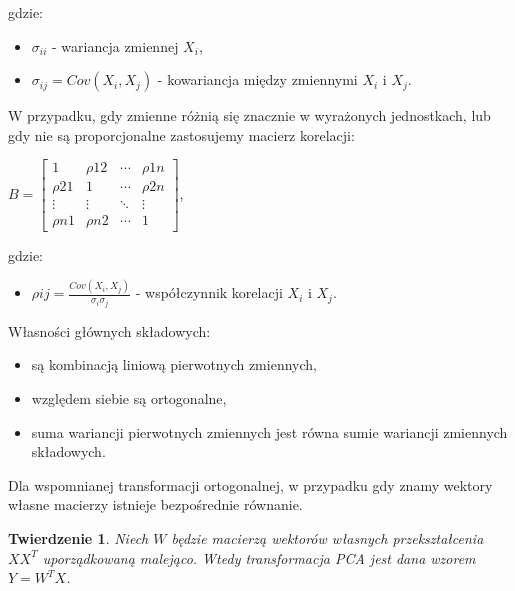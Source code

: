 \documentclass[12pt,a4paper]{report}
\newtheorem{tw}{Twierdzenie}
\begin{document}
gdzie:
\begin{itemize}
\item $\sigma_{ii}$ - wariancja zmiennej $X_i$,
\item $\sigma_{ij}=Cov(X_i,X_j)$ - kowariancja między zmiennymi $X_i$ i $X_j$.
\end{itemize}
W przypadku, gdy zmienne różnią się znacznie w wyrażonych jednostkach, lub gdy nie są proporcjonalne zastosujemy macierz korelacji:
\begin{center}
$ B= \left[
        \begin{array}{cccc}
         1 & \rho{12} & \cdots & \rho{1n}\\
         \rho{21} & 1 & \cdots & \rho{2n}\\
         \vdots & \vdots & \ddots & \vdots\\
         \rho{n1} & \rho{n2} & \cdots & 1
         \end{array}
      \right]$, 
\end{center}
gdzie:
\begin{itemize}
\item $\rho{ij}=\frac{Cov(X_i,X_j)}{\sigma_{i}\sigma_{j}}$ - współczynnik korelacji $X_i$ i $X_j$.
\end{itemize}
\bigskip
\bigskip
Własności głównych składowych:
\begin{itemize}
\item są kombinacją liniową pierwotnych zmiennych,
\item względem siebie są ortogonalne,
\item suma wariancji pierwotnych zmiennych jest równa sumie wariancji zmiennych składowych.
\end{itemize}
\bigskip
\bigskip
Dla wspomnianej transformacji ortogonalnej, w przypadku gdy znamy wektory własne macierzy istnieje bezpośrednie równanie.
\begin{tw}
Niech $W$ będzie macierzą wektorów własnych przekształcenia $XX^T$ uporządkowaną malejąco.
Wtedy transformacja PCA jest dana wzorem $Y=W^T X$.
\end{tw}
\end{document}
